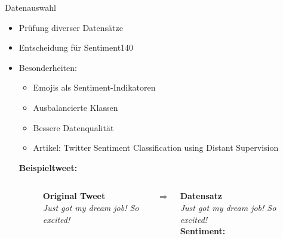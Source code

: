 \documentclass[aspectratio=169]{beamer} %
\begin{document}
\begin{frame}{Datenauswahl}
  \begin{itemize}
      \item Prüfung diverser Datensätze
      \item Entscheidung für \glqq Sentiment140\grqq
      \item Besonderheiten:
      \begin{itemize}
          \item Emojis als Sentiment-Indikatoren
          \item Ausbalancierte Klassen
          \item Bessere Datenqualität
          \item Artikel: \glqq Twitter Sentiment Classification using Distant Supervision\grqq
      \end{itemize}

      \vspace{0.5cm}
  \textbf{Beispieltweet:}
  \vspace{0.2cm}

\begin{figure}
    \centering
    \begin{columns}[T]
        \begin{column}{0.45\textwidth}
            \centering
            \textbf{Original Tweet}\\
            \textit{Just got my dream job! So excited! \yellowhighlight{:)}}
            \vspace{0.5cm}
        \end{column}

        \begin{column}{0.1\textwidth}
            \centering
            \LARGE $\Rightarrow$
        \end{column}

        \begin{column}{0.45\textwidth}
            \centering
            \textbf{Datensatz}\\
            \textit{Just got my dream job! So excited!} \\
            \vspace{0.2cm}
            \textbf{Sentiment: }
            \vspace{0.5cm}
        \end{column}
    \end{columns}
\end{figure}

  \end{itemize}
\end{frame}
\end{document}

